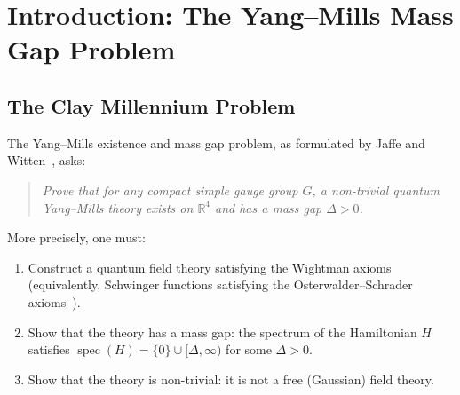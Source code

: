 \documentclass[12pt]{article}
\theoremstyle{plain}
\theoremstyle{definition}
\numberwithin{equation}{section}
\newcommand{\R}{\mathbb{R}}
\newcommand{\spec}{\operatorname{spec}}
\newcommand{\pr}{\mathrm{pr}}
\newcommand{\loc}{\mathrm{loc}}
\newcommand{\ex}{\mathrm{ex}}
\newcommand{\ov}{\mathrm{ov}}
\newcommand{\tr}{\mathrm{tr}}
\begin{document}
\begin{titlepage}
\begin{abstract}
\textbf{Stage~III} (Gluing).
Wilson lattice gauge theory is connected to the principal description via spectral-entry bundles and connected polymer expansion.  The exact blocked action decomposes as $\mathcal{S}^{\ex}=\mathcal{S}^{\pr}+E$ with $\|E\|=O((a/\ell)^{2\omega})$.  The pair covariance decay and transport nondegeneracy are established without circular dependence on the polymer expansion.

\textbf{Stage~IV} (Descent).
The principal gap is transferred to the physical transfer operator via bounded current comparison, yielding a uniform finite-cutoff Poincar\'e inequality.  The continuum limit preserves the gap, giving
\[
\spec(H_G)\cap(0,\Delta_G)=\varnothing,
\qquad
\Delta_G=\frac{2\mu_{\loc}}{\Lambda_{\pr}M_{\tr}^2\nu_{\ov}}\cdot M_G\min(\delta_G,1)>0.
\]
The proof uses as external inputs only the Osterwalder--Schrader reconstruction theorem, the Brascamp--Lieb covariance inequality, and the Wilson reflection positivity of lattice gauge theory.
\end{abstract}
\end{titlepage}

\setcounter{page}{1}
\tableofcontents
\newpage


\section*{Introduction: The Yang--Mills Mass Gap Problem}

\subsection*{The Clay Millennium Problem}

The Yang--Mills existence and mass gap problem, as formulated by Jaffe and Witten~\cite{JaffeWitten}, asks:

\begin{quote}
\emph{Prove that for any compact simple gauge group $G$, a non-trivial quantum Yang--Mills theory exists on $\R^4$ and has a mass gap $\Delta>0$.}
\end{quote}

More precisely, one must:
\begin{enumerate}[label=(\roman*)]
\item Construct a quantum field theory satisfying the Wightman axioms (equivalently, Schwinger functions satisfying the Osterwalder--Schrader axioms~\cite{OsterwalderSchrader}).
\item Show that the theory has a mass gap: the spectrum of the Hamiltonian $H$ satisfies $\spec(H)=\{0\}\cup[\Delta,\infty)$ for some $\Delta>0$.
\item Show that the theory is non-trivial: it is not a free (Gaussian) field theory.
\end{enumerate}
\end{document}
